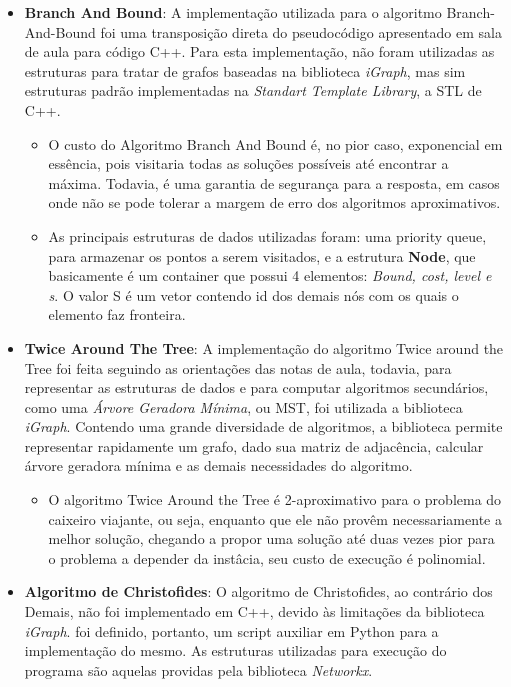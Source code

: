 \documentclass{article}
\begin{document}
\begin{itemize}
    \item \textbf{Branch And Bound}: A implementação utilizada para o algoritmo Branch-And-Bound foi uma transposição direta do pseudocódigo apresentado em sala de aula para código C++. Para esta implementação, não foram utilizadas as estruturas para tratar de grafos baseadas na biblioteca \textit{iGraph}, mas sim estruturas padrão implementadas na \textit{Standart Template Library}, a STL de C++.
    \begin{itemize}
        \item O custo do Algoritmo Branch And Bound é, no pior caso, exponencial em essência, pois visitaria todas as soluções possíveis até encontrar a máxima. Todavia, é uma garantia de segurança para a resposta, em casos onde não se pode tolerar a margem de erro dos algoritmos aproximativos.
        \item As principais estruturas de dados utilizadas foram: uma priority queue, para armazenar os pontos a serem visitados, e a estrutura \textbf{Node}, que basicamente é um container que possui 4 elementos: \textit{Bound, cost, level e s}. O valor S é um vetor contendo id dos demais nós com os quais o elemento faz fronteira.
    \end{itemize}
    \item \textbf{Twice Around The Tree}: A implementação do algoritmo Twice around the Tree foi feita seguindo as orientações das notas de aula, todavia, para representar as estruturas de dados e para computar algoritmos secundários, como uma \textit{Árvore Geradora Mínima}, ou MST, foi utilizada a biblioteca \textit{iGraph}. Contendo uma grande diversidade de algoritmos, a biblioteca permite representar rapidamente um grafo, dado sua matriz de adjacência, calcular árvore geradora mínima e as demais necessidades do algoritmo.
    \begin{itemize}
        \item O algoritmo Twice Around the Tree é 2-aproximativo para o problema do caixeiro viajante, ou seja, enquanto que ele não provêm necessariamente a melhor solução, chegando a propor uma solução até duas vezes pior para o problema a depender da instâcia, seu custo de execução é polinomial.
    \end{itemize}
    \item \textbf{Algoritmo de Christofides}: O algoritmo de Christofides, ao contrário dos Demais, não foi implementado em C++, devido às limitações da biblioteca \textit{iGraph}. foi definido, portanto, um script auxiliar em Python para a implementação do mesmo. As estruturas utilizadas para execução do programa são aquelas providas pela biblioteca \textit{Networkx}. 

\end{itemize}
\end{document}
